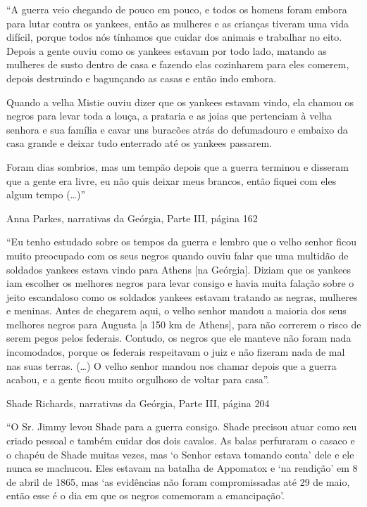 ``A guerra veio chegando de pouco em pouco, e todos os homens foram
embora para lutar contra os yankees, então as mulheres e as crianças
tiveram uma vida difícil, porque todos nós tínhamos que cuidar dos
animais e trabalhar no eito. Depois a gente ouviu como os yankees
estavam por todo lado, matando as mulheres de susto dentro de casa e
fazendo elas cozinharem para eles comerem, depois destruindo e
bagunçando as casas e então indo embora.

Quando a velha Mistie ouviu dizer que os yankees estavam vindo, ela
chamou os negros para levar toda a louça, a prataria e as joias que
pertenciam à velha senhora e sua família e cavar uns buracões atrás do
defumadouro e embaixo da casa grande e deixar tudo enterrado até os
yankees passarem.

Foram dias sombrios, mas um tempão depois que a guerra terminou e
disseram que a gente era livre, eu não quis deixar meus brancos, então
fiquei com eles algum tempo (\ldots{})''

Anna Parkes, narrativas da Geórgia, Parte III, página 162

``Eu tenho estudado sobre os tempos da guerra e lembro que o velho
senhor ficou muito preocupado com os seus negros quando ouviu falar que
uma multidão de soldados yankees estava vindo para Athens {[}na
Geórgia{]}. Diziam que os yankees iam escolher os melhores negros para
levar consigo e havia muita falação sobre o jeito escandaloso como os
soldados yankees estavam tratando as negras, mulheres e meninas. Antes
de chegarem aqui, o velho senhor mandou a maioria dos seus melhores
negros para Augusta {[}a 150 km de Athens{]}, para não correrem o risco
de serem pegos pelos federais. Contudo, os negros que ele manteve não
foram nada incomodados, porque os federais respeitavam o juiz e não
fizeram nada de mal nas suas terras. (\ldots{}) O velho senhor mandou
nos chamar depois que a guerra acabou, e a gente ficou muito orgulhoso
de voltar para casa''.

Shade Richards, narrativas da Geórgia, Parte III, página 204

``O Sr. Jimmy levou Shade para a guerra consigo. Shade precisou atuar
como seu criado pessoal e também cuidar dos dois cavalos. As balas
perfuraram o casaco e o chapéu de Shade muitas vezes, mas `o Senhor
estava tomando conta' dele e ele nunca se machucou. Eles estavam na
batalha de Appomatox e `na rendição' em 8 de abril de 1865, mas `as
evidências não foram compromissadas até 29 de maio, então esse é o dia
em que os negros comemoram a emancipação'.

